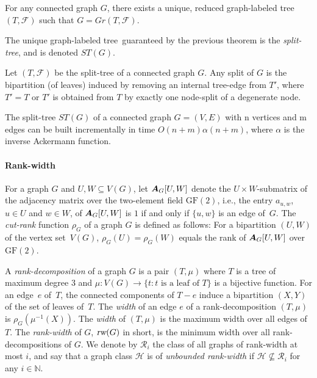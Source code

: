 \documentclass{llncs}
\newcommand{\Nat}{\mathbb{N}}
\newcommand{\FF}{\mathcal{F}}
\newcommand{\RR}{\mathcal{R}}
\def\mx#1{\mbox{\boldmath$#1$}}
\def\HH{{\mathcal H}}
\def\GLT{graph-labeled tree}
\newcommand{\rw}{\text{\normalfont\slshape rw}}
\begin{document}
{\begin{theorem}\label{thm:uniquereducedGLT}
For any connected graph $G$, there exists a unique, reduced graph-labeled tree $(T , \FF)$ such that $G = Gr(T , \FF)$.
\end{theorem}

The unique \GLT~guaranteed by the previous theorem is the \emph{split-tree}, and is denoted $ST(G)$.

\begin{theorem}\label{thm:splitinGLT}
Let   $(T , \FF)$ be the split-tree of a connected graph $G$. Any split of $G$ is the bipartition
(of leaves) induced by removing an internal tree-edge from $T'$, where $T' = T$ or $T'$ is
obtained from $T$ by exactly one node-split of a degenerate node.
\end{theorem}


\begin{theorem}\label{thm:computingGLT}
The split-tree $ST(G)$ of a connected graph $G = (V , E)$ with n vertices and
m edges can be built incrementally in time $O(n +m)\alpha(n + m)$, where $\alpha$ is the inverse Ackermann function.
\end{theorem}
}

 \lv{\prelimsplitsb}

\paragraph{Rank-width}


For a graph $G$ and $U,W\subseteq V(G)$, let $\mx A_G[U,W]$ denote the
$U\times W$-submatrix of the adjacency matrix over the two-element
field $\mathrm{GF}(2)$, i.e., the entry $a_{u,w}$, $u\in U$ and $w\in
W$, of $\mx A_G[U,W]$ is $1$ if and only if $\{u,w\}$ is an edge
of~$G$.  The {\em cut-rank} function $\rho_G$ of a graph $G$ is
defined as follows: For a bipartition $(U,W)$ of the vertex
set~$V(G)$, $\rho_G(U)=\rho_G(W)$ equals the rank of $\mx A_G[U,W]$
over $\mathrm{GF}(2)$. 

A \emph{rank-decomposition} of a graph $G$ is a pair $(T,\mu)$
where $T$ is a tree of maximum degree 3 and $\mu:V(G)\rightarrow \{t:
\text{$t$ is a leaf of $T$}\}$ is a bijective function. For an edge~$e$ of~$T$, the connected components of $T - e$ induce a
bipartition $(X,Y)$ of the set of leaves of~$T$.  The \emph{width} of
an edge $e$ of a rank-decomposition $(T,\mu)$ is $\rho_G(\mu^{-1} (X))$.
The \emph{width} of $(T,\mu)$ is the maximum width over all edges of~$T$.  The \emph{rank-width} of $G$, $\rw(G)$ in short, is the minimum width over all
rank-decompositions of $G$. We denote by $\RR_i$ the class of all graphs of rank-width at most $i$, and say that a graph class $\HH$ is of \emph{unbounded rank-width} if $\HH\not \subseteq \RR_i$ for any $i\in \Nat$.
\end{document}
